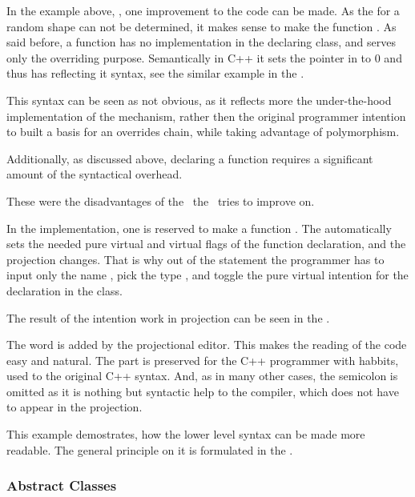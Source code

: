 In the example above, , one improvement to the code can be made. As the  for a random shape can not 
be determined, it makes sense to make the  function . As said before, a  
function has no implementation in the declaring class, and serves only the overriding purpose. Semantically in C++ it sets the 
pointer in  to 0 and thus has reflecting it syntax, see the similar example in the .

This syntax can be seen as not obvious, as it reflects more the under-the-hood implementation of the mechanism,
rather then the original programmer intention to built a basis for an overrides chain, while taking advantage of 
polymorphism.

Additionally, as discussed above, declaring a  function requires a significant amount of the syntactical
overhead. 

These were the disadvantages of the \cpppl\ the \pcpp\ tries to improve on.

In the \pcpp implementation, one  is reserved to make a function . The  automatically
sets the needed pure virtual and virtual flags of the function declaration, and the projection changes. That is why out of the 
statement  the programmer has to input only the name , pick the type , and
toggle the pure virtual intention for the declaration in the  class.

The result of the intention work in projection can be seen in the .


The word  is added by the projectional editor. This makes the reading of the code easy and natural.
The  part is preserved for the C++ programmer with habbits, used to the original C++ syntax. And, as in many other cases, 
the semicolon is omitted as it is nothing but syntactic help to the compiler, which does not have to appear 
in the projection. 

This example demostrates, how the lower level syntax can be made more readable. The general principle on it is formulated in
the .

\subsubsection{Abstract Classes}
\label{abstractclasses}

